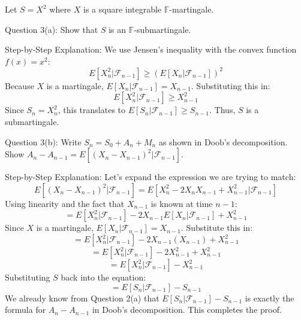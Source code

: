 Let $S = X^2$ where $X$ is a square integrable $\mathbb{F}$-martingale.

Question 3(a): Show that $S$ is an $\mathbb{F}$-submartingale.

Step-by-Step Explanation:
We use Jensen's inequality with the convex function $f(x) = x^2$:
\[ E[X_n^2 | \mathcal{F}_{n-1}] \ge (E[X_n | \mathcal{F}_{n-1}])^2 \]
Because $X$ is a martingale, $E[X_n | \mathcal{F}_{n-1}] = X_{n-1}$. Substituting this in:
\[ E[X_n^2 | \mathcal{F}_{n-1}] \ge X_{n-1}^2 \]
Since $S_n = X_n^2$, this translates to $E[S_n | \mathcal{F}_{n-1}] \ge S_{n-1}$. Thus, $S$ is a submartingale.

Question 3(b): Write $S_n = S_0 + A_n + M_n$ as shown in Doob's decomposition. Show $A_n - A_{n-1} = E[(X_n - X_{n-1})^2 | \mathcal{F}_{n-1}]$.

Step-by-Step Explanation:
Let's expand the expression we are trying to match:
\[ E[(X_n - X_{n-1})^2 | \mathcal{F}_{n-1}] = E[X_n^2 - 2X_n X_{n-1} + X_{n-1}^2 | \mathcal{F}_{n-1}] \]
Using linearity and the fact that $X_{n-1}$ is known at time $n-1$:
\[ = E[X_n^2 | \mathcal{F}_{n-1}] - 2X_{n-1}E[X_n | \mathcal{F}_{n-1}] + X_{n-1}^2 \]
Since $X$ is a martingale, $E[X_n | \mathcal{F}_{n-1}] = X_{n-1}$. Substitute this in:
\[ = E[X_n^2 | \mathcal{F}_{n-1}] - 2X_{n-1}(X_{n-1}) + X_{n-1}^2 \]
\[ = E[X_n^2 | \mathcal{F}_{n-1}] - 2X_{n-1}^2 + X_{n-1}^2 \]
\[ = E[X_n^2 | \mathcal{F}_{n-1}] - X_{n-1}^2 \]
Substituting $S$ back into the equation:
\[ = E[S_n | \mathcal{F}_{n-1}] - S_{n-1} \]
We already know from Question 2(a) that $E[S_n | \mathcal{F}_{n-1}] - S_{n-1}$ is exactly the formula for $A_n - A_{n-1}$ in Doob's decomposition. This completes the proof.